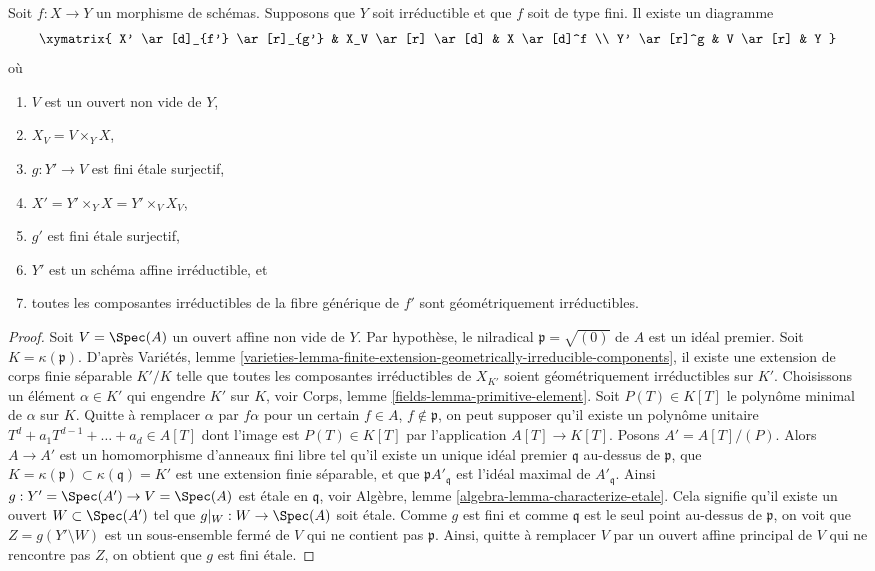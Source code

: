 \begin{lemma}
\label{lemma-make-components-generic-fibre-geometrically-irreducible}
Soit $f : X \to Y$ un morphisme de schémas.
Supposons que $Y$ soit irréductible et que $f$ soit de type fini.
Il existe un diagramme
$$
\xymatrix{
X' \ar[d]_{f'} \ar[r]_{g'} & X_V \ar[r] \ar[d] & X \ar[d]^f \\
Y' \ar[r]^g & V \ar[r] & Y
}
$$
où
\begin{enumerate}
\item $V$ est un ouvert non vide de $Y$,
\item $X_V = V \times_Y X$,
\item $g : Y' \to V$ est fini étale surjectif,
\item $X' = Y' \times_Y X = Y' \times_V X_V$,
\item $g'$ est fini étale surjectif,
\item $Y'$ est un schéma affine irréductible, et
\item toutes les composantes irréductibles de la fibre générique de $f'$
sont géométriquement irréductibles.
\end{enumerate}
\end{lemma}

\begin{proof}
Soit $V = \Spec(A)$ un ouvert affine non vide de $Y$.
Par hypothèse, le nilradical $\mathfrak p = \sqrt{(0)}$ de $A$ est un idéal premier.
Soit $K = \kappa(\mathfrak p)$. D'après
Variétés, lemme
\ref{varieties-lemma-finite-extension-geometrically-irreducible-components},
il existe une extension de corps finie séparable
$K'/K$ telle que toutes les composantes irréductibles de $X_{K'}$ soient
géométriquement irréductibles sur $K'$.
Choisissons un élément $\alpha \in K'$ qui engendre $K'$ sur
$K$, voir
Corps, lemme \ref{fields-lemma-primitive-element}.
Soit $P(T) \in K[T]$ le polynôme minimal de $\alpha$ sur $K$.
Quitte à remplacer $\alpha$ par $f \alpha$ pour un certain
$f \in A$, $f \not \in \mathfrak p$,
on peut supposer qu'il existe un polynôme unitaire
$T^d + a_1T^{d - 1} + \ldots + a_d \in A[T]$ dont l'image est
$P(T) \in K[T]$ par l'application $A[T] \to K[T]$.
Posons $A' = A[T]/(P)$. Alors $A \to A'$ est un homomorphisme d'anneaux fini libre
tel qu'il existe un unique idéal premier $\mathfrak q$ au-dessus de
$\mathfrak p$, que
$K = \kappa(\mathfrak p) \subset \kappa(\mathfrak q) = K'$
est une extension finie séparable, et que $\mathfrak pA'_{\mathfrak q}$
est l'idéal maximal de $A'_{\mathfrak q}$.
Ainsi $g : Y' = \Spec(A') \to V = \Spec(A)$
est étale en $\mathfrak q$, voir
Algèbre, lemme \ref{algebra-lemma-characterize-etale}.
Cela signifie qu'il existe un ouvert $W \subset \Spec(A')$ tel
que $g|_W : W \to \Spec(A)$ soit étale.
Comme $g$ est fini et comme $\mathfrak q$ est le seul point au-dessus de
$\mathfrak p$, on voit que $Z = g(Y' \setminus W)$ est un sous-ensemble fermé de $V$
qui ne contient pas $\mathfrak p$. Ainsi, quitte à remplacer $V$ par un ouvert affine
principal de $V$ qui ne rencontre pas $Z$, on obtient que $g$ est fini
étale.
\end{proof}

